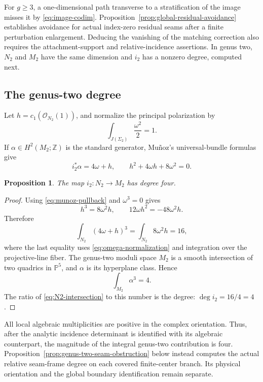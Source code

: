 \documentclass[11pt]{amsart}
\newtheorem{proposition}[theorem]{Proposition}
\theoremstyle{definition}
\theoremstyle{remark}
\theoremstyle{plain}
\newcommand{\ZZ}{\mathbb{Z}}
\newcommand{\PP}{\mathbb{P}}
\newcommand{\cO}{\mathcal{O}}
\begin{document}
For $g\geq3$, a one-dimensional path transverse to a stratification
of the image misses it by \eqref{eq:image-codim}.
Proposition~\ref{prop:global-residual-avoidance} establishes avoidance
for actual index-zero residual seams after a finite perturbation
enlargement. Deducing the vanishing of the matching correction also
requires the attachment-support and relative-incidence assertions.
In genus two, $N_2$ and $M_2$ have the
same dimension and $i_2$ has a nonzero degree, computed next.

\subsection{The genus-two degree}\label{sec:genus-two-degree}
Let $h=c_1(\cO_{N_2}(1))$, and normalize the principal polarization by
\begin{equation}\label{eq:omega-normalization}
                    \int_{J(\Sigma_2)}\frac{\omega^2}{2}=1.
\end{equation}
If $\alpha\in H^2(M_2;\ZZ)$ is the standard generator, Mu\~noz's
universal-bundle formulas give
\begin{equation}\label{eq:munoz-pullback}
 i_2^*\alpha=4\omega+h,
 \qquad h^2+4\omega h+8\omega^2=0.
\end{equation}

\begin{proposition}\label{prop:degree-four}
The map $i_2:N_2\to M_2$ has degree four.
\end{proposition}

\begin{proof}
Using \eqref{eq:munoz-pullback} and $\omega^3=0$ gives
\[
 h^3=8\omega^2h,
 \qquad 12\omega h^2=-48\omega^2h.
\]
Therefore
\begin{equation}\label{eq:N2-intersection}
 \int_{N_2}(4\omega+h)^3
 =\int_{N_2}8\omega^2h=16,
\end{equation}
where the last equality uses \eqref{eq:omega-normalization} and integration
over the projective-line fiber.  The genus-two moduli space $M_2$ is a
smooth intersection of two quadrics in $\PP^5$, and $\alpha$ is its
hyperplane class.  Hence
\[
                         \int_{M_2}\alpha^3=4.
\]
The ratio of \eqref{eq:N2-intersection} to this number is the degree:
$\deg i_2=16/4=4$.
\end{proof}

All local algebraic multiplicities are positive in the complex
orientation.  Thus, after the analytic incidence determinant is
identified with its algebraic counterpart, the magnitude of the integral
genus-two contribution is four.
Proposition~\ref{prop:genus-two-seam-obstruction} below instead
computes the actual relative seam-frame degree on each covered
finite-center branch. Its physical orientation and the global
boundary identification remain separate.
\end{document}
